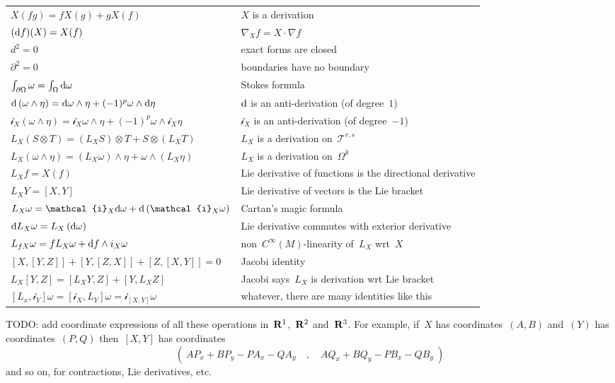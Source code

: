 \begin{tabular}{l|l}
	\hline
	$X(fg)=fX(g)+gX(f)$ & $X$ is a derivation \\
	$(\mathrm{d} f)(X)=X(f)$ & $\nabla_Xf=X\cdot \nabla f$\\
	$d^2=0$ & exact forms are closed \\
	$\partial^2=0$ & boundaries have no boundary \\
	$\int_{\partial\Omega}\omega=\int_\Omega\mathrm{d}\omega$ & Stokes formula \\
	$\mathrm{d}\left(\omega\wedge\eta\right)=
	\mathrm{d}\omega\wedge\eta+(-1)^p\omega\wedge\mathrm{d}\eta$ &
	$\mathrm{d}$ is an anti-derivation (of degree~$1$)\\
	$\mathcal{i}_X\left(\omega\wedge\eta\right)=
	\mathcal{i}_X\omega\wedge\eta+(-1)^p\omega\wedge\mathcal{i}_X\eta$
	& $\mathcal{i}_X$ is an anti-derivation (of degree~$-1$)\\
	$L_X\left(S\otimes T\right)=
	\left(L_XS\right)\otimes T
	+
	S\otimes\left(L_XT\right)
	$ & $L_X$ is a derivation on~$\mathcal{T}^{r,s}$\\
	$L_X\left(\omega\wedge\eta\right)=
	\left(L_X\omega\right)\wedge\eta
	+
	\omega\wedge\left(L_X\eta\right)
	$ & $L_X$ is a derivation on~$\Omega^k$\\
	$L_Xf=X(f)$ & Lie derivative of functions is the directional derivative\\
	$L_XY=[X,Y]$ & Lie derivative of vectors is the Lie bracket\\
	$L_X\omega=\mathcal{i}_X\ud\omega+\ud\left(\mathcal{i}_X\omega\right)$ &
	Cartan's magic formula \\
	$\mathrm{d} L_X\omega=L_X\left(\mathrm{d}\omega\right)$ &
	Lie derivative commutes with exterior derivative\\
	$L_{fX}\omega=fL_X\omega+\mathrm{d} f\wedge i_X\omega$ &
	non~$C^\infty(M)$-linearity of~$L_X$ wrt~$X$\\
	$[X,[Y,Z]]+[Y,[Z,X]]+[Z,[X,Y]]=0$ & Jacobi identity\\
	$L_X[Y,Z]=[L_XY,Z]+[Y,L_XZ]$ &
	Jacobi says~$L_X$ is derivation wrt Lie bracket\\
	$[L_x,\mathcal{i}_Y]\omega=
	[\mathcal{i}_X,L_Y]\omega=
	\mathcal{i}_{[X,Y]}\omega$ & whatever, there are many identities like this\\
\end{tabular}

\bigskip

TODO: add coordinate expressions of all these operations in~$\mathbf{R}^1$,~$\mathbf{R}^2$
and~$\mathbf{R}^3$.  For example, if~$X$ has coordinates~$(A,B)$ and~$(Y)$ has
coordinates~$(P,Q)$ then~$[X,Y]$ has coordinates
\[
	\left(\ %
		AP_x+BP_y-PA_x-QA_y
		\quad , \quad
		AQ_x+BQ_y-PB_x-QB_y
	\ \right)
\]
and so on, for contractions, Lie derivatives, etc.



